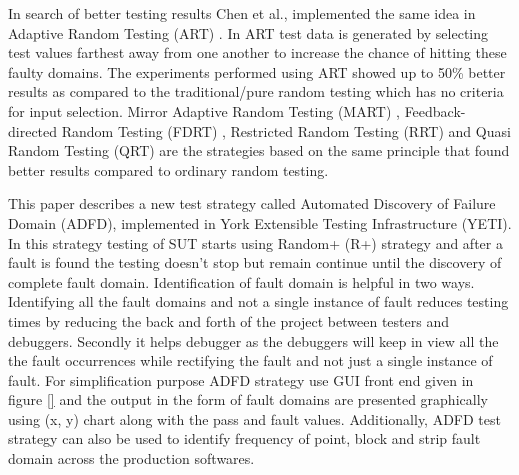 \documentclass{acm_proc_article-sp}
\begin{document}
In search of better testing results Chen et al., implemented the same idea in Adaptive Random Testing (ART) \cite{Chen2008}. In ART test data is generated by selecting test values farthest away from one another to increase the chance of hitting these faulty domains. The experiments performed using ART showed up to 50\% better results as compared to the traditional/pure random testing which has no criteria for input selection. Mirror Adaptive Random Testing (MART)  \cite{Chen2003}, Feedback-directed Random Testing (FDRT) \cite{Pacheco2007}, Restricted Random Testing (RRT) \cite{Chan2002} and Quasi Random Testing  (QRT) \cite{Chen2005} are the strategies based on the same principle that found better results compared to ordinary random testing.


This paper describes a new test strategy called Automated Discovery of Failure Domain (ADFD), implemented in York Extensible Testing Infrastructure (YETI). In this strategy testing of SUT starts using Random+ (R+) strategy and after a fault is found the testing doesn't stop but remain continue until the discovery of complete fault domain. Identification of fault domain is helpful in two ways. Identifying all the fault domains and not a single instance of fault reduces testing times by reducing the back and forth of the project between testers and debuggers. Secondly it helps debugger as the debuggers will keep in view all the the fault occurrences while rectifying the fault and not just a single instance of fault. For simplification purpose ADFD strategy use GUI front end given in figure \ref{} and the output in the form of fault domains are presented graphically using (x, y) chart along with the pass and fault values. Additionally, ADFD test strategy can also be used to identify frequency of point, block and strip fault domain across the production softwares.



\end{document}

